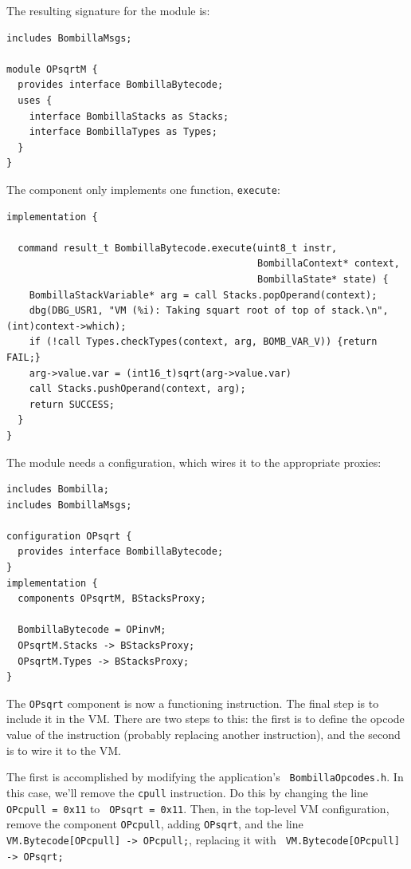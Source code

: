 \documentclass[10pt]{article}
\begin{document}
The resulting signature for the module is:

\begin{verbatim}
includes BombillaMsgs;

module OPsqrtM {
  provides interface BombillaBytecode;
  uses {
    interface BombillaStacks as Stacks;
    interface BombillaTypes as Types;
  }
}
\end{verbatim}

The component only implements one function, {\tt execute}:

\begin{verbatim}
implementation {

  command result_t BombillaBytecode.execute(uint8_t instr,
                                            BombillaContext* context,
                                            BombillaState* state) {
    BombillaStackVariable* arg = call Stacks.popOperand(context);
    dbg(DBG_USR1, "VM (%i): Taking squart root of top of stack.\n", (int)context->which);
    if (!call Types.checkTypes(context, arg, BOMB_VAR_V)) {return FAIL;}
    arg->value.var = (int16_t)sqrt(arg->value.var)
    call Stacks.pushOperand(context, arg);
    return SUCCESS;
  }
}
\end{verbatim}

The module needs a configuration, which wires it to the appropriate
proxies:

\begin{verbatim}
includes Bombilla;
includes BombillaMsgs;

configuration OPsqrt {
  provides interface BombillaBytecode;
}
implementation {
  components OPsqrtM, BStacksProxy;

  BombillaBytecode = OPinvM;
  OPsqrtM.Stacks -> BStacksProxy;
  OPsqrtM.Types -> BStacksProxy;
}
\end{verbatim}

The {\tt OPsqrt} component is now a functioning instruction. The final
step is to include it in the VM. There are two steps to this: the
first is to define the opcode value of the instruction (probably
replacing another instruction), and the second is to wire it to the VM.

The first is accomplished by modifying the application's {\tt
BombillaOpcodes.h}. In this case, we'll remove the {\tt cpull}
instruction. Do this by changing the line {\tt OPcpull = 0x11} to {\tt
OPsqrt = 0x11}. Then, in the top-level VM configuration, remove the
component {\tt OPcpull}, adding {\tt OPsqrt}, and the line {\tt
VM.Bytecode[OPcpull] -> OPcpull;}, replacing it with {\tt
VM.Bytecode[OPcpull] -> OPsqrt;}
\end{document}
